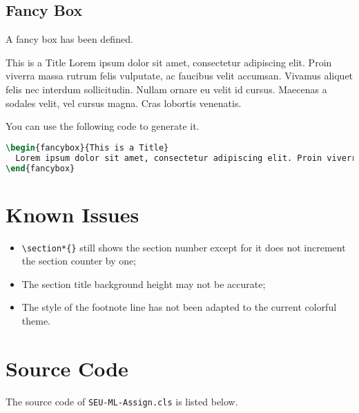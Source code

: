 \documentclass{seu-ml-assign}
\renewcommand{\sectionheadname}{Section}
\begin{document}
    \subsection{Fancy Box} A fancy box has been defined.
      \begin{fancybox}{This is a Title}
        Lorem ipsum dolor sit amet, consectetur adipiscing elit. Proin viverra massa rutrum felis vulputate, ac faucibus velit accumsan. Vivamus aliquet felis nec interdum sollicitudin. Nullam ornare eu velit id cursus. Maecenas a sodales velit, vel cursus magna. Cras lobortis venenatis.
      \end{fancybox}


    You can use the following code to generate it.
    \begin{lstlisting}[language=tex,numbers=none,morekeywords={begin}]
\begin{fancybox}{This is a Title}
  Lorem ipsum dolor sit amet, consectetur adipiscing elit. Proin viverra massa rutrum felis vulputate, ac faucibus velit accumsan. Vivamus aliquet felis nec interdum sollicitudin. Nullam ornare eu velit id cursus. Maecenas a sodales velit, vel cursus magna. Cras lobortis venenatis.
\end{fancybox}
    \end{lstlisting}

  \appendix
  \renewcommand{\sectionheadname}{Appendix}

  \section{Known Issues}\label{sec:known_issues}

    \begin{itemize}
      \item \verb|\section*{}| still shows the section number except for it does not increment the section counter by one;
      \item The section title background height may not be accurate;
      \item The style of the footnote line has not been adapted to the current colorful theme.
    \end{itemize}

  \section{Source Code}

    The source code of \texttt{SEU-ML-Assign.cls} is listed below.

    
\end{document}
